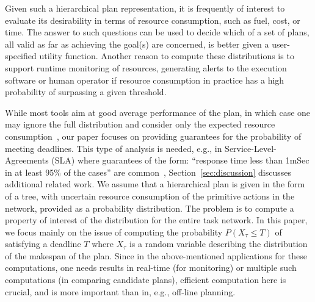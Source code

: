 \documentclass[review]{elsarticle}
\begin{document}
Given such a hierarchical plan representation, it is frequently of interest to evaluate its desirability in terms of resource consumption, such as fuel, cost, or time. The answer to such questions can be used to decide which of a set of plans, all valid as far as achieving the goal(s) are concerned, is better given a user-specified utility function. Another reason to compute these distributions is to support runtime monitoring of resources, generating alerts to the execution software or human operator if resource consumption in practice has a high probability of surpassing a given threshold.

While most tools aim at good average performance of the plan, in which case one may ignore the 
full distribution and consider only the expected resource consumption~\cite{bonfietti2014disregarding}, our paper focuses
on providing guarantees for the probability of meeting deadlines. This type of analysis is needed, e.g., in
Service-Level-Agreements (SLA) where guarantees of the form: ``response time less than 1mSec in at least 95\% of the cases'' are common~\cite{buyya2011sla}, 
Section~\ref{sec:discussion} discusses additional related work.
We assume that a hierarchical plan is given in the form of a tree, with uncertain resource consumption of the primitive actions in the network, provided as a probability distribution. The problem is to compute a property of interest of the distribution for the entire task network. In this paper, we focus mainly on the issue of computing the probability $P(X_\tau \leq T)$ of satisfying a deadline $T$ where $X_\tau$ is a random variable describing the distribution of the makespan of the plan. Since in the above-mentioned applications for these computations, one needs results in real-time (for monitoring) or multiple such computations (in comparing candidate plans), efficient computation here is crucial, and is more important than in, e.g., off-line planning.
\end{document}
